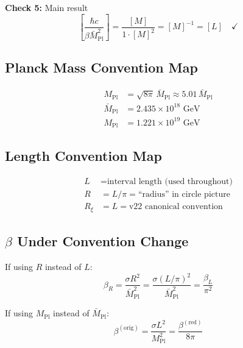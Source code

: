 \documentclass[11pt,a4paper]{article}
\begin{document}
\textbf{Check 5:} Main result
\begin{equation}
  \left[ \frac{\hbar c}{\beta \bar{M}_{\text{Pl}}^2} \right]
  = \frac{[M]}{1 \cdot [M]^2} = [M]^{-1} = [L] \quad \checkmark
  \label{eq:dim-main}
\end{equation}

\subsection{Planck Mass Convention Map}

\begin{align}
  M_{\text{Pl}} &= \sqrt{8\pi} \, \bar{M}_{\text{Pl}} \approx 5.01 \, \bar{M}_{\text{Pl}}
  \label{eq:planck-map} \\
  \bar{M}_{\text{Pl}} &= 2.435 \times 10^{18} \text{ GeV}
  \label{eq:Mpl-value} \\
  M_{\text{Pl}} &= 1.221 \times 10^{19} \text{ GeV}
  \label{eq:MPl-value}
\end{align}

\subsection{Length Convention Map}

\begin{align}
  L &= \text{interval length (used throughout)} \label{eq:L-conv} \\
  R &= L/\pi = \text{``radius'' in circle picture} \label{eq:R-conv} \\
  R_\xi &= L = \text{v22 canonical convention} \label{eq:Rxi-conv}
\end{align}

\subsection{$\beta$ Under Convention Change}

If using $R$ instead of $L$:
\begin{equation}
  \beta_R = \frac{\sigma R^2}{\bar{M}_{\text{Pl}}^2} = \frac{\sigma (L/\pi)^2}{\bar{M}_{\text{Pl}}^2}
          = \frac{\beta_L}{\pi^2}
  \label{eq:beta-R-L}
\end{equation}

If using $M_{\text{Pl}}$ instead of $\bar{M}_{\text{Pl}}$:
\begin{equation}
  \beta^{(\text{orig})} = \frac{\sigma L^2}{M_{\text{Pl}}^2}
                        = \frac{\beta^{(\text{red})}}{8\pi}
  \label{eq:beta-orig-red}
\end{equation}
\end{document}

